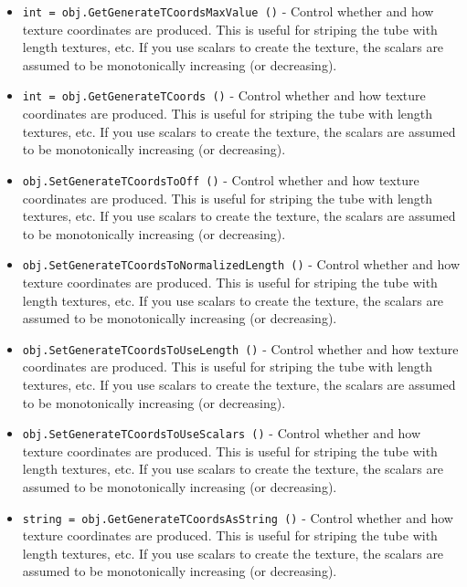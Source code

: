 \begin{itemize}
\item  \verb|int = obj.GetGenerateTCoordsMaxValue ()| -  Control whether and how texture coordinates are produced. This is
 useful for striping the tube with length textures, etc. If you
 use scalars to create the texture, the scalars are assumed to be
 monotonically increasing (or decreasing).

\item  \verb|int = obj.GetGenerateTCoords ()| -  Control whether and how texture coordinates are produced. This is
 useful for striping the tube with length textures, etc. If you
 use scalars to create the texture, the scalars are assumed to be
 monotonically increasing (or decreasing).

\item  \verb|obj.SetGenerateTCoordsToOff ()| -  Control whether and how texture coordinates are produced. This is
 useful for striping the tube with length textures, etc. If you
 use scalars to create the texture, the scalars are assumed to be
 monotonically increasing (or decreasing).

\item  \verb|obj.SetGenerateTCoordsToNormalizedLength ()| -  Control whether and how texture coordinates are produced. This is
 useful for striping the tube with length textures, etc. If you
 use scalars to create the texture, the scalars are assumed to be
 monotonically increasing (or decreasing).

\item  \verb|obj.SetGenerateTCoordsToUseLength ()| -  Control whether and how texture coordinates are produced. This is
 useful for striping the tube with length textures, etc. If you
 use scalars to create the texture, the scalars are assumed to be
 monotonically increasing (or decreasing).

\item  \verb|obj.SetGenerateTCoordsToUseScalars ()| -  Control whether and how texture coordinates are produced. This is
 useful for striping the tube with length textures, etc. If you
 use scalars to create the texture, the scalars are assumed to be
 monotonically increasing (or decreasing).

\item  \verb|string = obj.GetGenerateTCoordsAsString ()| -  Control whether and how texture coordinates are produced. This is
 useful for striping the tube with length textures, etc. If you
 use scalars to create the texture, the scalars are assumed to be
 monotonically increasing (or decreasing).


\end{itemize}
